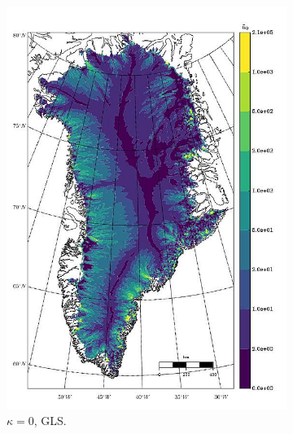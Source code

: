 \begin{figure}
  
  \centering 

  \begin{subfigure}[b]{0.25\linewidth}
    \includegraphics[width=\linewidth]{images/balance_velocity/greenland/Ubar_5H_kappa_0_GLS.jpg}
  \caption{$\kappa = 0$, GLS.}
  \label{greenland_bv_image_kappa_0_GLS}
  \end{subfigure}
  \begin{subfigure}[b]{0.25\linewidth}

\end{subfigure}
\end{figure}
